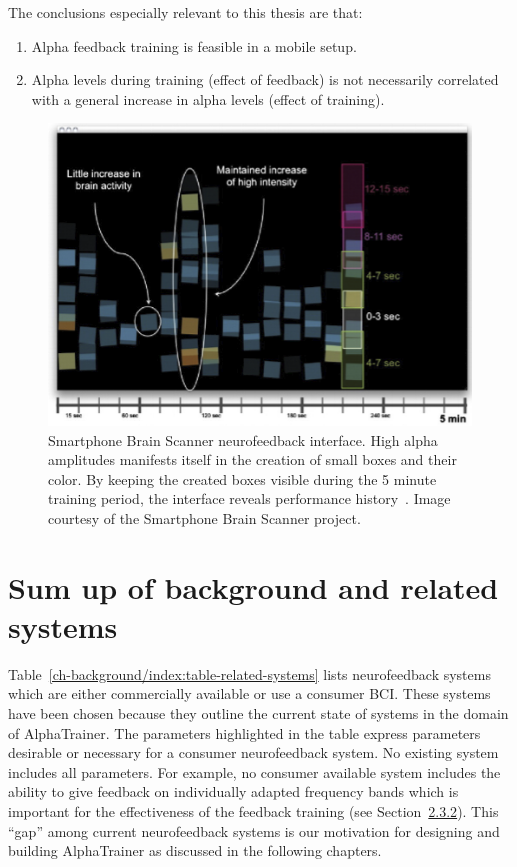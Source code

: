 \documentclass[a4paper,10pt,english,lof,lot,twoside]{puthesis}
\begin{document}
The conclusions especially relevant to this thesis are that:
\begin{enumerate}
\item {} 
Alpha feedback training is feasible in a mobile setup.

\item {} 
Alpha levels during training (effect of feedback) is not necessarily
correlated with a general increase in alpha levels (effect of training).

\end{enumerate}
\begin{figure}[tbp]
\centering
\capstart

\includegraphics[width=0.600\linewidth]{smartphone-brain-scanner-feedback.png}
\caption[Smartphone Brain Scanner neurofeedback interface]{Smartphone Brain Scanner neurofeedback interface. High alpha amplitudes manifests
itself in the creation of small boxes and their color. By
keeping the created boxes visible during the 5 minute training period, the
interface reveals performance history \cite{stopczynski_smartphones_2013}.
Image courtesy of the Smartphone Brain Scanner project.}\label{ch-background/index:fig-related-smartphone-brain-scanner-feedback}\end{figure}


\section{Sum up of background and related systems}
\label{ch-background/index:sum-up-of-background-and-related-systems}
Table \ref{ch-background/index:table-related-systems} lists neurofeedback systems
which are either commercially available or use a consumer BCI.
These systems have been chosen because they
outline the current state of systems in the domain of AlphaTrainer.
The parameters highlighted in the table express
parameters desirable or necessary for a consumer neurofeedback system.
No existing system includes all parameters. For example,
no consumer available system includes the ability to give feedback on individually
adapted frequency bands which is important for the effectiveness of
the feedback training (see Section {\hyperref[ch-background/index:sec-background-stress-alpha-feedback-training]{2.3.2}}).
This ``gap'' among current neurofeedback systems is our motivation
for designing and building
AlphaTrainer as discussed in the following chapters.
\end{document}
